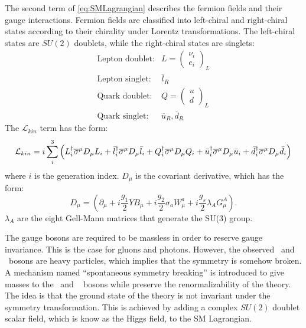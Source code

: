 \documentclass[thesis.tex]{subfiles}
\begin{document}
The second term of \ref{eq:SMLagrangian} describes the fermion fields and their gauge interactions. 
Fermion fields are classified into left-chiral and right-chiral states according to their chirality under Lorentz transformations. 
The left-chiral states are $SU(2)$ doublets, while the right-chiral states are singlets:
	\begin{equation}
		\begin{array}{cl}
		\text{Lepton doublet}: & L = \left( \begin{array}{c} \nu_i \\ e_i \end{array} \right)_L \\
		\text{Lepton singlet}:  & \overline{l}_{R} \\
		\text{Quark doublet}:  & Q =  \left( \begin{array}{c} u \\ d \end{array} \right)_L \\
		\text{Quark singlet}:    & \overline{u}_{R}, \overline{d}_{R}
		\end{array}
	\end{equation}
The $\mathcal{L}_{kin}$ term has the form: 
	\begin{equation}
		\mathcal{L}_{kin} = i \sum_{i}^3 \left( L_i^\dagger \mathrm{\overline{\sigma}}^\mu D_\mu L_i +
									\bar{l}_i^\dagger \mathrm{\overline{\sigma}}^\mu D_\mu \bar{l}_i + 
									Q_i^\dagger \mathrm{\overline{\sigma}}^\mu D_\mu Q_i +
									\bar{u}_i^\dagger \mathrm{\overline{\sigma}}^\mu D_\mu \bar{u}_i +
									\bar{d}_i^\dagger \mathrm{\overline{\sigma}}^\mu D_\mu \bar{d}_i \right)
	\end{equation}
where $i$ is the generation index. $D_\mu$ is the covariant derivative, which has the form: 
	\begin{equation}
		D_\mu = (\partial_\mu + i \frac{g_1}{2}YB_\mu + i \frac{g_2}{2}\sigma_a W_\mu^a + i\frac{g_s}{2} \lambda_A G_\mu^{A} ).
	\end{equation}
$\lambda_A$ are the eight Gell-Mann matrices that generate the SU(3) group. 
 
The gauge bosons are required to be massless in order to reserve gauge invariance. 
This is the case for gluons and photons. However, the observed \PWpm~and \PZ~bosons are heavy particles, which implies that the symmetry is somehow broken. 
A mechanism named ``spontaneous symmetry breaking'' is introduced to give masses to the \PWpm~and \PZ~ bosons while preserve the renormalizability of the theory. 
The idea is that the ground state of the theory is not invariant under the symmetry transformation.
This is achieved by adding a complex $SU(2)$ doublet scalar field, which is know as the Higgs field, to the SM Lagrangian. 
\end{document}
